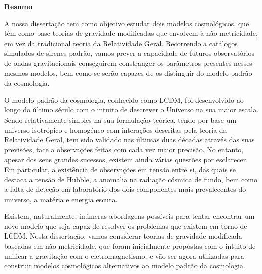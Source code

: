 
\vspace*{2cm}
\begin{center}
    \Large \bf Resumo
\end{center}
\vspace*{1cm} \setlength{\baselineskip}{0.6cm}

A nossa dissertação tem como objetivo estudar dois modelos cosmológicos, que têm como base teorias de gravidade modificadas que envolvem à não-metricidade, em vez da tradicional teoria da Relatividade Geral. Recorrendo a catálogos simulados de sirenes padrão, vamos prever a capacidade de futuros observatórios de ondas gravitacionais conseguirem constranger os parâmetros presentes nesses mesmos modelos, bem como se serão capazes de os distinguir do modelo padrão da cosmologia.

O modelo padrão da cosmologia, conhecido como \gls{LCDM}, foi desenvolvido ao longo do último século com o intuito de descrever o Universo na sua maior escala. Sendo relativamente simples na sua formulação teórica, tendo por base um universo isotrópico e homogéneo com interações descritas pela teoria da Relatividade Geral, tem sido validado nas últimas duas décadas através das suas previsões, face a observações feitas com cada vez maior precisão. No entanto, apesar dos seus grandes sucessos, existem ainda várias questões por esclarecer. Em particular, a existência de observações em tensão entre si, das quais se destaca a tensão de Hubble, a anomalia na radiação cósmica de fundo, bem como a falta de deteção em laboratório dos dois componentes mais prevalecentes do universo, a matéria e energia escura.

Existem, naturalmente, inúmeras abordagens possíveis para tentar encontrar um novo modelo que seja capaz de resolver os problemas que existem em torno de \gls{LCDM}. Nesta dissertação, vamos considerar teorias de gravidade modificada baseadas em não-metricidade, que foram inicialmente propostas com o intuito de unificar a gravitação com o eletromagnetismo, e vão ser agora utilizadas para construir modelos cosmológicos alternativos ao modelo padrão da cosmologia.

